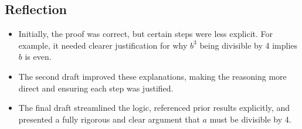 \newpage

\subsection{Reflection}

\begin{itemize}
    \item Initially, the proof was correct, but certain steps were less explicit. For example, it needed clearer justification for why \( b^3 \) being divisible by 4 implies \( b \) is even.
    \item The second draft improved these explanations, making the reasoning more direct and ensuring each step was justified.
    \item The final draft streamlined the logic, referenced prior results explicitly, and presented a fully rigorous and clear argument that \( a \) must be divisible by 4.
\end{itemize}
